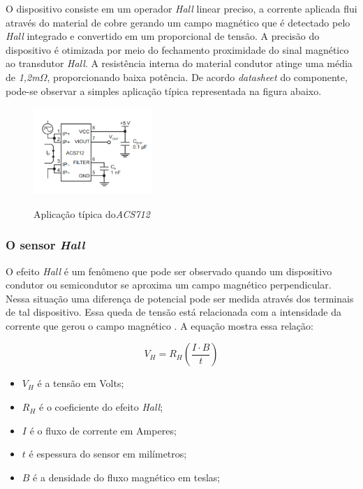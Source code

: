 O dispositivo consiste em um operador \textit{Hall} linear preciso, a corrente aplicada flui através do material de cobre gerando um campo magnético que é detectado pelo \textit{Hall} integrado e convertido em um proporcional de tensão. A precisão do dispositivo é otimizada por meio do fechamento proximidade do sinal magnético ao transdutor \textit{Hall}. A resistência interna do material condutor atinge uma média de \textit{1,2m}$\Omega$, proporcionando baixa potência. De acordo \textit{datasheet} do componente, pode-se observar a simples aplicação típica representada na figura abaixo.
 
\begin{figure}[H]
	\centering
	\caption{Aplicação típica do\textit{ACS712}}
	\includegraphics[width=0.4\textwidth]{figuras/ACS712_typical.png}
	\label{fig:acs712_typical}
\end{figure} 

\subsubsection{O sensor \textit{Hall}}

O efeito \textit{Hall} é um fenômeno que pode ser observado quando um dispositivo condutor ou semicondutor se aproxima um campo magnético perpendicular. Nessa situação uma diferença de potencial pode ser medida através dos terminais de tal dispositivo. Essa queda de tensão está relacionada com a intensidade da corrente que gerou o campo magnético \cite{ElectronicsTutorials}. A equação mostra essa relação: 

\begin{equation}
V_H = R_H\left ( \frac{I\cdot B}{t} \right)
\end{equation}

\begin{itemize}
	
	\item $V_H$ é a tensão em Volts;
	\item $R_H$ é o coeficiente do efeito \textit{Hall};
	\item  $I$ é o fluxo de corrente em Amperes;
	\item $t$ é espessura do sensor em milímetros;
	\item $B$ é a densidade do fluxo magnético em teslas; \ \\
\end{itemize}

